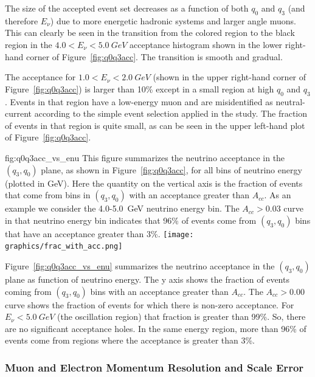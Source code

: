 The size of the accepted event set decreases as a function of both $q_0$ and $q_3$ (and therefore $E_\nu$) due to more energetic hadronic systems and larger angle muons. This can clearly be seen in the transition from the colored region to the black region in the $\num{4.0} < E_\nu < \SI{5.0}{GeV}$ acceptance histogram shown in the lower right-hand corner of Figure~\ref{fig:q0q3acc}. The transition is smooth and gradual. %

The acceptance for $\num{1.0} < E_\nu < \SI{2.0}{GeV}$ (shown in the upper right-hand corner of Figure~\ref{fig:q0q3acc}) is larger than 10\% except in a small region at high $q_0$ and $q_3$. Events in that region have a low-energy muon and are misidentified as neutral-current according to the simple event selection applied in the study. The fraction of events in that region is quite small, as can be seen in the upper left-hand plot of Figure~\ref{fig:q0q3acc}. 

\begin{dunefigure}{fig:q0q3acc_vs_enu}
{This figure summarizes the neutrino acceptance in the $(q_3,q_0)$ plane, as shown in Figure~\ref{fig:q0q3acc}, for all bins of neutrino energy (plotted in GeV). Here the quantity on the vertical axis is the fraction of events that come from bins in $(q_3,q_0)$ with an acceptance greater than $A_{cc}$. As an example we consider the \num{4.0}-\SI{5.0}{GeV} neutrino energy bin. The $A_{cc}>0.03$ curve in that neutrino energy bin indicates that 96\% of events come from $(q_3,q_0)$ bins that have an acceptance greater than 3\%. }
      \texttt{[image: graphics/frac\_with\_acc.png]}
\end{dunefigure}

Figure~\ref{fig:q0q3acc_vs_enu} summarizes the neutrino acceptance in the $(q_3,q_0)$ plane as function of neutrino energy. The y axis shows the fraction of events coming from $(q_3,q_0)$ bins with an acceptance greater than $A_{cc}$. The $A_{cc}>0.00$ curve shows the fraction of events for which there is non-zero acceptance. For $E_\nu < \SI{5.0}{GeV}$ (the oscillation region) that fraction is greater than 99\%. So, there are no significant acceptance holes.  In the same energy region, more than 96\% of events come from regions where the acceptance is greater than 3\%. %

\subsubsection{Muon and Electron Momentum Resolution and Scale Error}

